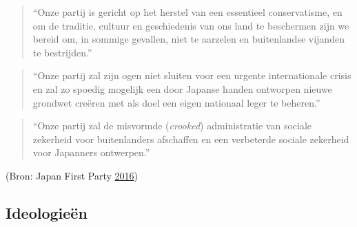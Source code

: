 \documentclass[10.5pt,dutch,]{article}
\begin{document}
\begin{quote}
``Onze partij is gericht op het herstel van een essentieel
conservatisme, en om de traditie, cultuur en geschiedenis van ons land
te beschermen zijn we bereid om, in sommige gevallen, niet te aarzelen
en buitenlandse vijanden te bestrijden.''
\end{quote}

\begin{quote}
``Onze partij zal zijn ogen niet sluiten voor een urgente internationale
crisis en zal zo spoedig mogelijk een door Japanse handen ontworpen
nieuwe grondwet creëren met als doel een eigen nationaal leger te
beheren.''
\end{quote}

\begin{quote}
``Onze partij zal de misvormde (\emph{crooked}) administratie van
sociale zekerheid voor buitenlanders afschaffen en een verbeterde
sociale zekerheid voor Japanners ontwerpen.''
\end{quote}

(Bron: Japan First Party
\protect\hyperlink{ref-japanux5ffirstux5fpartyux5fjapanux5f2016}{2016})

\subsection{Ideologieën}\label{ideologieuxebn}
\end{document}
